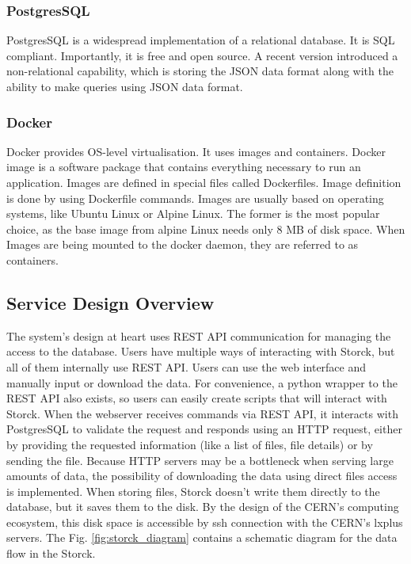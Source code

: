 \subsubsection{PostgresSQL}
PostgresSQL \cite{postgres} is a widespread implementation of a relational database. It is SQL compliant. Importantly, it is free and open source. A recent version introduced a non-relational capability, which is storing the JSON data format along with the ability to make queries using JSON data format.

\subsubsection{Docker}

Docker \cite{merkel2014docker} provides OS-level virtualisation. It uses images and containers. Docker image is a software package that contains everything necessary to run an application.
Images are defined in special files called Dockerfiles. Image definition is done by using Dockerfile commands.
Images are usually based on operating systems, like Ubuntu Linux or Alpine Linux.
The former is the most popular choice, as the base image from alpine Linux needs only 8 MB of disk space.
When Images are being mounted to the docker daemon, they are referred to as containers.

\subsection{Service Design Overview}

The system's design at heart uses REST API communication for managing the access to the database.
Users have multiple ways of interacting with Storck, but all of them internally use REST API.
Users can use the web interface and manually input or download the data.
For convenience, a python wrapper to the REST API also exists, so users can easily create scripts that will interact with Storck.
When the webserver receives commands via REST API, it interacts with PostgresSQL to validate the request and responds using an HTTP request, either by providing the requested information (like a list of files, file details) or by sending the file.
Because HTTP servers may be a bottleneck when serving large amounts of data, the possibility of downloading the data using direct files access is implemented.
When storing files, Storck doesn't write them directly to the database, but it saves them to the disk.
By the design of the CERN's computing ecosystem, this disk space is accessible by ssh connection with the CERN's lxplus servers.
The Fig. \ref{fig:storck_diagram} contains a schematic diagram for the data flow in the Storck.


